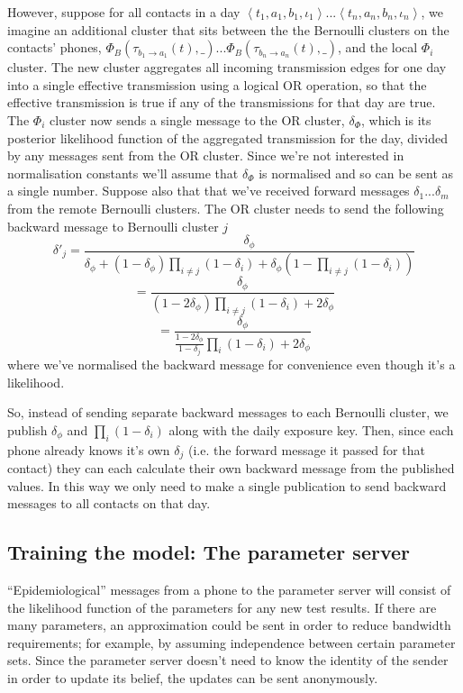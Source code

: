 \documentclass{article}
\begin{document}
However, suppose for all contacts in a day $\left<t_1,a_1,b_1,\iota_1\right>...\left<t_n,a_n,b_n,\iota_n\right>$, we imagine an additional cluster that sits between the the Bernoulli clusters on the contacts' phones, $ \Phi_B(\tau_{b_1\rightarrow a_1}(t),\_) ... \Phi_B(\tau_{b_n\rightarrow a_n}(t),\_)$, and the local $\Phi_i$ cluster. The new cluster aggregates all incoming transmission edges for one day into a single effective transmission using a logical OR operation, so that the effective transmission is true if any of the transmissions for that day are true. The $\Phi_i$ cluster now sends a single message to the OR cluster, $\delta_\Phi$, which is its posterior likelihood function of the aggregated transmission for the day, divided by any messages sent from the OR cluster. Since we're not interested in normalisation constants we'll assume that $\delta_\Phi$ is normalised and so can be sent as a single number. Suppose also that that we've received forward messages $\delta_1...\delta_m$ from the remote Bernoulli clusters. The OR cluster needs to send the following backward message to Bernoulli cluster $j$
\[
\delta'_j = \frac{\delta_\phi}{\delta_\phi + (1-\delta_\phi)\prod_{i\ne j}(1-\delta_i) + \delta_\phi(1 - \prod_{i\ne j}(1-\delta_i))}
\]
\[
= \frac{\delta_\phi}{ (1-2\delta_\phi)\prod_{i\ne j}(1-\delta_i) + 2\delta_\phi}
\]
\[
= \frac{\delta_\phi}{ \frac{1-2\delta_\phi}{1-\delta_j}\prod_{i}(1-\delta_i) + 2\delta_\phi}
\]
where we've normalised the backward message for convenience even though it's a likelihood.

So, instead of sending separate backward messages to each Bernoulli cluster, we publish $\delta_\phi$ and $\prod_i (1-\delta_i)$ along with the daily exposure key. Then, since each phone already knows it's own $\delta_j$ (i.e. the forward message it passed for that contact) they can each calculate their own backward message from the published values. In this way we only need to make a single publication to send backward messages to all contacts on that day.

\subsection{Training the model: The parameter server}

``Epidemiological'' messages from a phone to the parameter server will consist of the likelihood function of the parameters for any new test results. If there are many parameters, an approximation could be sent in order to reduce bandwidth requirements; for example, by assuming independence between certain parameter sets. Since the parameter server doesn't need to know the identity of the sender in order to update its belief, the updates can be sent anonymously.
\end{document}
